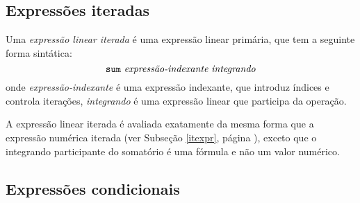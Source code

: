 \documentclass[11pt, brazil]{report}
\begin{document}
%
%

\vspace*{-5pt}

\subsection{Expressões iteradas}

Uma {\it expressão linear iterada} é uma expressão linear primária,
que tem a seguinte forma sintática:
$$\mbox{{\tt sum} {\it expressão-indexante} {\it integrando}}$$
onde {\it expressão-indexante} é uma expressão indexante, que
introduz índices e controla iterações, {\it integrando} é
uma expressão linear que participa da operação.

A expressão linear iterada é avaliada exatamente da mesma forma que a
expressão numérica iterada (ver Subseção \ref{itexpr}, página
\pageref{itexpr}), exceto que o integrando participante do
somatório é uma fórmula e não um valor numérico.

%

\vspace*{-5pt}

\subsection{Expressões condicionais}
\end{document}
